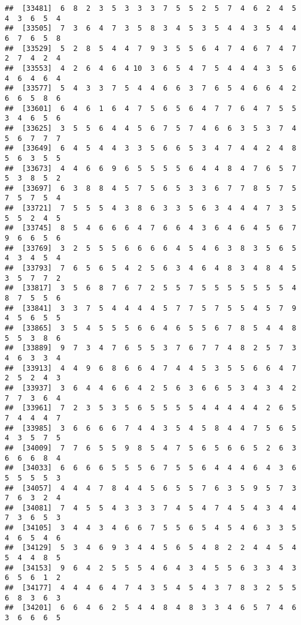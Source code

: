 \documentclass[
]{book}
\begin{document}
\begin{verbatim}
##  [33481]  6  8  2  3  5  3  3  3  7  5  5  2  5  7  4  6  2  4  5  4  3  6  5  4
##  [33505]  7  3  6  4  7  3  5  8  3  4  5  3  5  4  4  3  5  4  4  6  7  6  5  8
##  [33529]  5  2  8  5  4  4  7  9  3  5  5  6  4  7  4  6  7  4  7  2  7  4  2  4
##  [33553]  4  2  6  4  6  4 10  3  6  5  4  7  5  4  4  4  3  5  6  4  6  4  6  4
##  [33577]  5  4  3  3  7  5  4  4  6  6  3  7  6  5  4  6  6  4  2  6  6  5  8  6
##  [33601]  6  4  6  1  6  4  7  5  6  5  6  4  7  7  6  4  7  5  5  3  4  6  5  6
##  [33625]  3  5  5  6  4  4  5  6  7  5  7  4  6  6  3  5  3  7  4  5  6  7  7  7
##  [33649]  6  4  5  4  4  3  3  5  6  6  5  3  4  7  4  4  2  4  8  5  6  3  5  5
##  [33673]  4  4  6  6  9  6  5  5  5  5  6  4  4  8  4  7  6  5  7  5  3  8  5  2
##  [33697]  6  3  8  8  4  5  7  5  6  5  3  3  6  7  7  8  5  7  5  7  5  7  5  4
##  [33721]  7  5  5  5  4  3  8  6  3  3  5  6  3  4  4  4  7  3  5  5  5  2  4  5
##  [33745]  8  5  4  6  6  6  4  7  6  6  4  3  6  4  6  4  5  6  7  9  6  6  5  6
##  [33769]  3  2  5  5  5  6  6  6  6  4  5  4  6  3  8  3  5  6  5  4  3  4  5  4
##  [33793]  7  6  5  6  5  4  2  5  6  3  4  6  4  8  3  4  8  4  5  3  5  7  7  2
##  [33817]  3  5  6  8  7  6  7  2  5  5  7  5  5  5  5  5  5  5  4  8  7  5  5  6
##  [33841]  3  3  7  5  4  4  4  4  5  7  7  5  7  5  5  4  5  7  9  4  5  6  5  5
##  [33865]  3  5  4  5  5  5  6  6  4  6  5  5  6  7  8  5  4  4  8  5  5  3  8  6
##  [33889]  9  7  3  4  7  6  5  5  3  7  6  7  7  4  8  2  5  7  3  4  6  3  3  4
##  [33913]  4  4  9  6  8  6  6  4  7  4  4  5  3  5  5  6  6  4  7  2  5  2  4  3
##  [33937]  3  6  4  4  6  6  4  2  5  6  3  6  6  5  3  4  3  4  2  7  7  3  6  4
##  [33961]  7  2  3  5  3  5  6  5  5  5  5  4  4  4  4  4  2  6  5  7  4  4  4  7
##  [33985]  3  6  6  6  6  7  4  4  3  5  4  5  8  4  4  7  5  6  5  4  3  5  7  5
##  [34009]  7  7  6  5  5  9  8  5  4  7  5  6  5  6  6  5  2  6  3  6  6  6  8  4
##  [34033]  6  6  6  6  5  5  5  6  7  5  5  6  4  4  4  6  4  3  6  5  5  5  5  3
##  [34057]  4  4  4  7  8  4  4  5  6  5  5  7  6  3  5  9  5  7  3  7  6  3  2  4
##  [34081]  7  4  5  5  4  3  3  3  7  4  5  4  7  4  5  4  3  4  4  7  3  6  5  3
##  [34105]  3  4  4  3  4  6  6  7  5  5  6  5  4  5  4  6  3  3  5  4  6  5  4  6
##  [34129]  5  3  4  6  9  3  4  4  5  6  5  4  8  2  2  4  4  5  4  5  4  4  8  5
##  [34153]  9  6  4  2  5  5  5  4  6  4  3  4  5  5  6  3  3  4  3  6  5  6  1  2
##  [34177]  4  4  4  6  4  7  4  3  5  4  5  4  3  7  8  3  2  5  5  6  8  3  6  3
##  [34201]  6  6  4  6  2  5  4  4  8  4  8  3  3  4  6  5  7  4  6  3  6  6  6  5

\end{verbatim}
\end{document}
